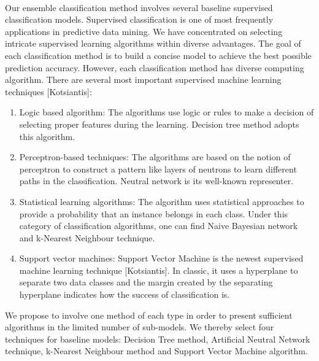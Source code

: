 \documentclass[runningheads]{llncs}
\begin{document}
\paragraph{}
Our ensemble classification method involves several baseline supervised classification models. Supervised classification is one of most frequently applications in predictive data mining. We have concentrated on selecting intricate supervised learning algorithms within diverse advantages. The goal of each classification method is to build a concise model to achieve the best possible prediction accuracy. However, each classification method has diverse computing algorithm. There are several most important supervised machine learning techniques [Kotsiantis]:
\begin{enumerate}[label=\alph*)]
	\item Logic based algorithm: The algorithms use logic or rules to make a decision of selecting proper features during the learning. Decision tree method adopts this algorithm.
	\item Perceptron-based techniques: The algorithms are based on the notion of perceptron to construct a pattern like layers of neutrons to learn different paths in the classification. Neutral network is its well-known representer.
	\item Statistical learning algorithms: The algorithm uses statistical approaches to provide a probability that an instance belongs in each class. Under this category of classification algorithms, one can find Naive Bayesian network and k-Nearest Neighbour technique.
	\item Support vector machines: Support Vector Machine is the newest supervised machine learning technique [Kotsiantis]. In classic, it uses a hyperplane to separate two data classes and the margin created by the separating hyperplane indicates how the success of classification is. 
\end{enumerate}
We propose to involve one method of each type in order to present sufficient algorithms in the limited number of sub-models. We thereby select four techniques for baseline models: Decision Tree method, Artificial Neutral Network technique, k-Nearest Neighbour method and Support Vector Machine algorithm.
%
%
\end{document}
